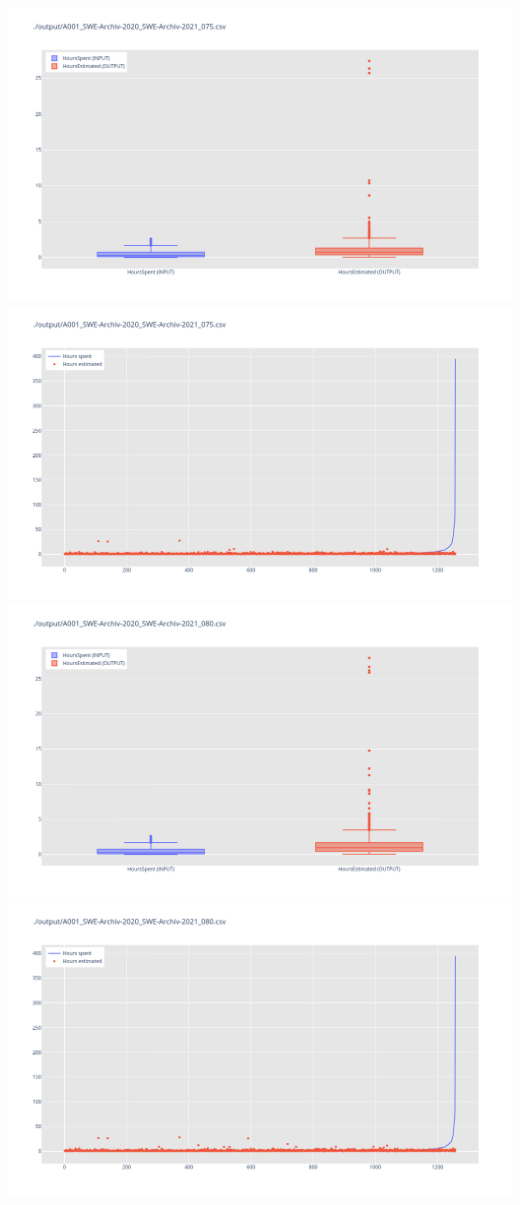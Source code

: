 \includegraphics[width=\textwidth]{Scripts/output/A001_SWE-Archiv-2020_SWE-Archiv-2021_075.csv.png}
\includegraphics[width=\textwidth]{Scripts/output/A001_SWE-Archiv-2020_SWE-Archiv-2021_075.csv.scatter.png}
\includegraphics[width=\textwidth]{Scripts/output/A001_SWE-Archiv-2020_SWE-Archiv-2021_080.csv.png}
\includegraphics[width=\textwidth]{Scripts/output/A001_SWE-Archiv-2020_SWE-Archiv-2021_080.csv.scatter.png}
